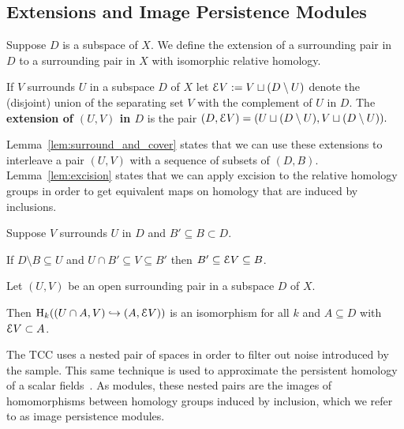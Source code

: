 \subsection{Extensions and Image Persistence Modules}

Suppose $D$ is a subspace of $X$.
We define the extension of a surrounding pair in $D$ to a surrounding pair in $X$ with isomorphic relative homology.

\begin{definition}[Extension]
  If $V$ surrounds $U$ in a subspace $D$ of $X$ let $\mathcal{E} V := V\sqcup (D\setminus U)$ denote the (disjoint) union of the separating set $V$ with the complement of $U$ in $D$.
  The \textbf{extension of $(U, V)$ in $D$} is the pair $(D, \mathcal{E} V) = (U\sqcup (D\setminus U), V\sqcup (D\setminus U)).$
\end{definition}

Lemma~\ref{lem:surround_and_cover} states that we can use these extensions to interleave a pair $(U, V)$ with a sequence of subsets of $(D, B)$.
Lemma~\ref{lem:excision} states that we can apply excision to the relative homology groups in order to get equivalent maps on homology that are induced by inclusions.

\begin{lemma}\label{lem:surround_and_cover}
  Suppose $V$ surrounds $U$ in $D$ and $B'\subseteq B\subset D$.

  If $D\setminus B\subseteq U$ and $U\cap B'\subseteq V\subseteq B'$ then $B'\subseteq \mathcal{E} V\subseteq B$.
\end{lemma}

\begin{lemma}\label{lem:excision}
  Let $(U, V)$ be an open surrounding pair in a subspace $D$ of $X$.

  Then $\mathrm{H}_k((U\cap A, V)\hookrightarrow (A, \mathcal{E} V))$ is an isomorphism for all $k$ and $A\subseteq D$ with $\mathcal{E} V\subset A$.
\end{lemma}

The TCC uses a nested pair of spaces in order to filter out noise introduced by the sample.
This same technique is used to approximate the persistent homology of a scalar fields~\cite{chazal09analysis}.
As modules, these nested pairs are the images of homomorphisms between homology groups induced by inclusion, which we refer to as image persistence modules.

